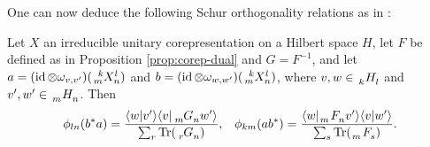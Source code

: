 One can now deduce the following Schur orthogonality relations as in \cite{}:
\begin{Cor} \label{cor:schur-2}
  Let $X$ an irreducible
  unitary corepresentation on a Hilbert space $H$, let $F$ be defined as in Proposition \ref{prop:corep-dual} and
  $G=F^{-1}$, and let $a=(\id \otimes \omega_{v,v'})(\Gr{X}{k}{l}{m}{n})$ and $b=(\id \otimes
  \omega_{w,w'})(\Gr{X}{k}{l}{m}{n})$, where $v,w \in \Grd{H}{k}{l}$ and $v',w' \in
  \Grd{H}{m}{n}$.  Then
  \begin{align*} 
    \phi_{ln}(b^{*}a) &= \frac{\langle w|v'\rangle\langle v|\Grd{G}{m}{n}w'\rangle}{\sum_{r}
      \Tr(\Grd{G}{r}{n})}, &  \phi_{km}(ab^{*}) = \frac{\langle w|\Grd{F}{m}{n}v'\rangle \langle v|w'\rangle}{\sum_{s}
      \Tr(\Grd{F}{m}{s})}.
  \end{align*}
\end{Cor}

